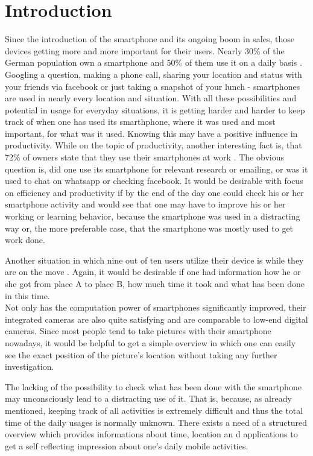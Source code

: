 \chapter{Introduction}
\label{cha:introduction}

Since  the introduction of the smartphone and its ongoing boom in sales, those devices getting more and more important for their users.
Nearly 30\% of the German population own a smartphone and 50\% of them use it on a daily basis \cite{gstatistic}. Googling a question, making a phone call, sharing your location and status with your friends via facebook or just taking a snapshot of your lunch - smartphones are used in nearly every location and situation. With all these possibilities and potential in usage for everyday situations, it is getting harder and harder to keep track of when one has used its smarthphone, where it was used and most important, for what was it used. Knowing this may have a positive influence in productivity.  While on the topic of productivity, another interesting fact is, that 72\% of owners state that they use their smartphones at work \cite{gstatistic}. The obvious question is, did one use its smartphone for relevant research or emailing, or was it used to chat on whatsapp or checking facebook. It would be desirable with focus on efficiency and productivity if by the end of the day one could check his or her smartphone activity and would see that one may have to improve his or her working or learning behavior, because the smartphone was used in a distracting way or, the more preferable case, that the smartphone was mostly used to get work done.

Another  situation in which nine out of ten users utilize their device is while they are on the move \cite{gstatistic}. Again, it would be desirable if one had information how he or she got from place A to place B, how much time it took and what has been done in this time.\\
Not only has the computation power of smartphones significantly improved, their integrated cameras are also quite satisfying and are comparable to low-end digital cameras.
Since most people tend to take pictures with their smartphone nowadays, it would be helpful to get a simple overview in which one can easily see the exact position of the picture's location without taking any further investigation.

The lacking of the possibility to check what has been done with the smartphone may unconsciously lead to a distracting use of it. That is, because, as already mentioned, keeping track of all activities is extremely difficult and thus the total time of the daily usages is normally unknown. There exists a need of a structured overview which provides informations about time, location an d applications to get a self reflecting impression about one's daily mobile activities.
